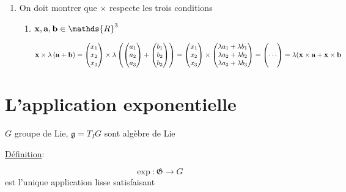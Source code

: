 \begin{tcolorbox}[title=tentative]
	\begin{enumerate}
		\item On doit montrer que \(\times \) respecte les trois conditions 
			\begin{enumerate}
				\item \(\vb{x}, \vb{a}, \vb{b} \in \mathds{R}^{3}\)

					\[ \vb{x} \times \lambda\left( \vb{a} + \vb{b} \right)  = \begin{pmatrix} x_1 \\ x_2 \\ x_3  \end{pmatrix} \times\lambda  \left( \begin{pmatrix} a_1 \\ a_2 \\ a_3   \end{pmatrix} + \begin{pmatrix} b_1 \\ b_2 \\ b_3 \end{pmatrix}  \right)  = \begin{pmatrix} x_1 \\ x_2 \\ x_3  \end{pmatrix} \times \begin{pmatrix} \lambda a_1 + \lambda b_1 \\ \lambda a_2 + \lambda b_2 \\ \lambda a_3 + \lambda b_3 \end{pmatrix}= \begin{pmatrix} \\ \dotsb \\ {} \end{pmatrix} = \lambda (\vb{x} \times  \vb{a} + \vb{x} \times \vb{b}  \]


			\end{enumerate}
	\end{enumerate} 
\end{tcolorbox}


\section*{L'application exponentielle}

\(G\) groupe de Lie, \(\mathfrak{g}= T_I G\) sont algèbre de Lie


\underline{Définition}:

\[ \exp : \mathfrak{G} \to G \]
est l'unique application lisse satisfaisant

